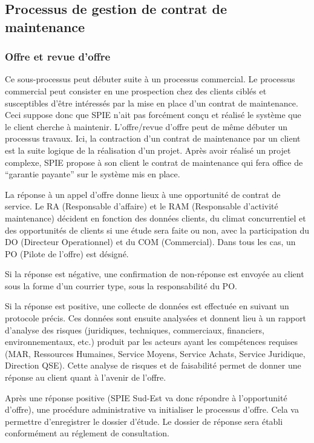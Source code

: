 \subsection{Processus de gestion de contrat de maintenance}

\subsubsection{Offre et revue d’offre}

Ce sous-processus peut débuter suite à un processus commercial. Le processus commercial peut consister en une prospection chez des clients ciblés et susceptibles d’être intéressés par la mise en place d’un contrat de maintenance. Ceci suppose donc que SPIE n’ait pas forcément conçu et réalisé le système que le client cherche à maintenir. L’offre/revue d’offre peut de même débuter un processus travaux. Ici, la contraction d’un contrat de maintenance par un client est la suite logique de la réalisation d’un projet. Après avoir réalisé un projet complexe, SPIE propose à son client le contrat de maintenance qui fera office de ``garantie payante'' sur le système mis en place.

La réponse à un appel d’offre donne lieux à une opportunité de contrat de service. Le RA (Responsable d’affaire) et le RAM (Responsable d’activité maintenance) décident en fonction des données clients, du climat concurrentiel et des opportunités de clients si une étude sera faite ou non, avec la participation du DO (Directeur Operationnel) et du COM (Commercial). Dans tous les cas, un PO (Pilote de l’offre) est désigné.

Si la réponse est négative, une confirmation de non-réponse est envoyée au client sous la forme d’un courrier type, sous la responsabilité du PO.

Si la réponse est positive, une collecte de données est effectuée en suivant un protocole précis. Ces données sont ensuite analysées et donnent lieu à un rapport d’analyse des risques (juridiques, techniques, commerciaux, financiers, environnementaux, etc.) produit par les acteurs ayant les compétences requises (MAR, Ressources Humaines, Service Moyens, Service Achats, Service Juridique, Direction QSE). Cette analyse de risques et de faisabilité permet de donner une réponse au client quant à l'avenir de l’offre.

Après une réponse positive (SPIE Sud-Est va donc répondre à l’opportunité d’offre), une procédure administrative va initialiser le processus d'offre. Cela va permettre d'enregistrer le dossier d'étude. Le dossier de réponse sera établi conformément au réglement de consultation.

